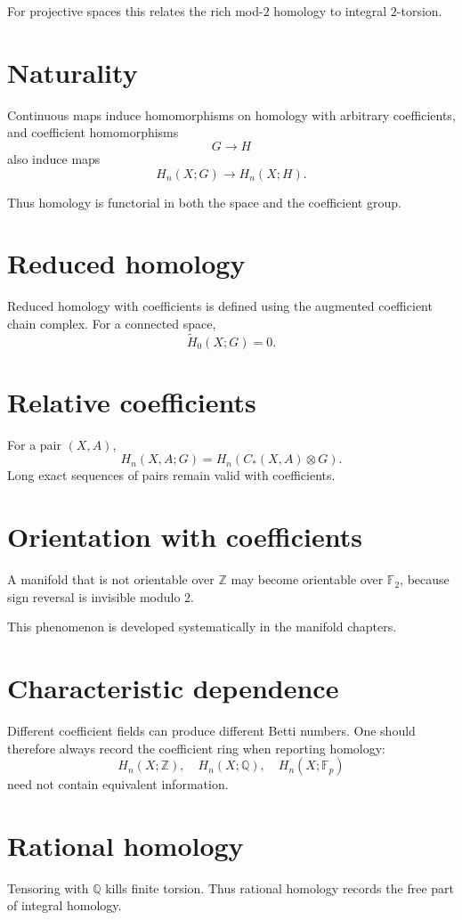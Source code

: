 For projective spaces this relates the rich mod-\(2\) homology to integral
\(2\)-torsion.

\section{Naturality}
Continuous maps induce homomorphisms on homology with arbitrary coefficients,
and coefficient homomorphisms
\[
G\to H
\]
also induce maps
\[
H_n(X;G)\to H_n(X;H).
\]

Thus homology is functorial in both the space and the coefficient group.

\section{Reduced homology}
Reduced homology with coefficients is defined using the augmented coefficient
chain complex.  For a connected space,
\[
\widetilde H_0(X;G)=0.
\]

\section{Relative coefficients}
For a pair \((X,A)\),
\[
H_n(X,A;G)
=
H_n(C_*(X,A)\otimes G).
\]
Long exact sequences of pairs remain valid with coefficients.

\section{Orientation with coefficients}
A manifold that is not orientable over \(\mathbb Z\) may become orientable over
\(\mathbb F_2\), because sign reversal is invisible modulo \(2\).

This phenomenon is developed systematically in the manifold chapters.

\section{Characteristic dependence}
Different coefficient fields can produce different Betti numbers.  One should
therefore always record the coefficient ring when reporting homology:
\[
H_n(X;\mathbb Z),
\quad
H_n(X;\mathbb Q),
\quad
H_n(X;\mathbb F_p)
\]
need not contain equivalent information.

\section{Rational homology}
Tensoring with \(\mathbb Q\) kills finite torsion.  Thus rational homology
records the free part of integral homology.


